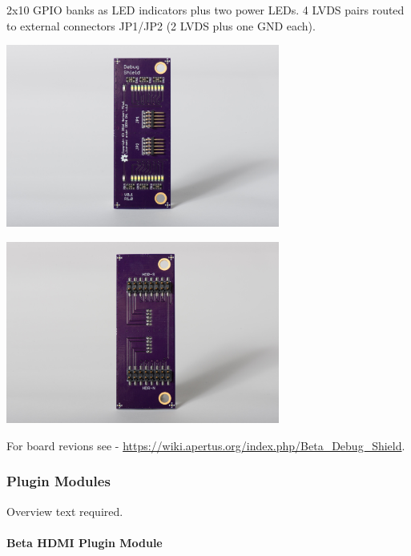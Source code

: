 2x10 GPIO banks as LED indicators plus two power LEDs. 4 LVDS pairs routed to external connectors JP1/JP2 (2 LVDS plus one GND each). 

\begin{center}
\includegraphics[height=6cm]{images/Debug-shield-bot01}
\end{center}

\begin{center}
\includegraphics[height=6cm]{images/Debug-shield-top01}
\end{center}

For board revions see - \href{https://wiki.apertus.org/index.php/Beta_Debug_Shield}{https://wiki.apertus.org/index.php/Beta_Debug_Shield}.\\







\subsubsection{Plugin Modules}

Overview text required.

\paragraph{Beta HDMI Plugin Module}\\

